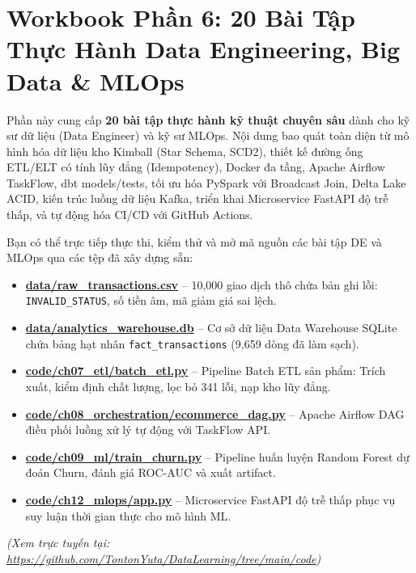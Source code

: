 \chapter{Workbook Phần 6: 20 Bài Tập Thực Hành Data Engineering, Big Data \& MLOps}

\begin{lythuyetbox}
Phần này cung cấp \textbf{20 bài tập thực hành kỹ thuật chuyên sâu} dành cho kỹ sư dữ liệu (Data Engineer) và kỹ sư MLOps. Nội dung bao quát toàn diện từ mô hình hóa dữ liệu kho Kimball (Star Schema, SCD2), thiết kế đường ống ETL/ELT có tính lũy đẳng (Idempotency), Docker đa tầng, Apache Airflow TaskFlow, dbt models/tests, tối ưu hóa PySpark với Broadcast Join, Delta Lake ACID, kiến trúc luồng dữ liệu Kafka, triển khai Microservice FastAPI độ trễ thấp, và tự động hóa CI/CD với GitHub Actions.
\end{lythuyetbox}

\begin{thuchanhbox}
Bạn có thể trực tiếp thực thi, kiểm thử và mở mã nguồn các bài tập DE và MLOps qua các tệp đã xây dựng sẵn:
\begin{itemize}
    \item \href{run:./data/raw_transactions.csv}{\Large\textbf{\color{navyprimary}data/raw\_transactions.csv}} -- 10,000 giao dịch thô chứa bản ghi lỗi: \texttt{INVALID\_STATUS}, số tiền âm, mã giảm giá sai lệch.
    \item \href{run:./data/analytics_warehouse.db}{\Large\textbf{\color{navyprimary}data/analytics\_warehouse.db}} -- Cơ sở dữ liệu Data Warehouse SQLite chứa bảng hạt nhân \texttt{fact\_transactions} (9,659 dòng đã làm sạch).
    \item \href{run:./code/ch07_etl/batch_etl.py}{\Large\textbf{\color{navyprimary}code/ch07\_etl/batch\_etl.py}} -- Pipeline Batch ETL sản phẩm: Trích xuất, kiểm định chất lượng, lọc bỏ 341 lỗi, nạp kho lũy đẳng.
    \item \href{run:./code/ch08_orchestration/ecommerce_dag.py}{\Large\textbf{\color{navyprimary}code/ch08\_orchestration/ecommerce\_dag.py}} -- Apache Airflow DAG điều phối luồng xử lý tự động với TaskFlow API.
    \item \href{run:./code/ch09_ml/train_churn.py}{\Large\textbf{\color{navyprimary}code/ch09\_ml/train\_churn.py}} -- Pipeline huấn luyện Random Forest dự đoán Churn, đánh giá ROC-AUC và xuất artifact.
    \item \href{run:./code/ch12_mlops/app.py}{\Large\textbf{\color{navyprimary}code/ch12\_mlops/app.py}} -- Microservice FastAPI độ trễ thấp phục vụ suy luận thời gian thực cho mô hình ML.
\end{itemize}
\small\textit{(Xem trực tuyến tại: \url{https://github.com/TontonYuta/DataLearning/tree/main/code})}
\end{thuchanhbox}

